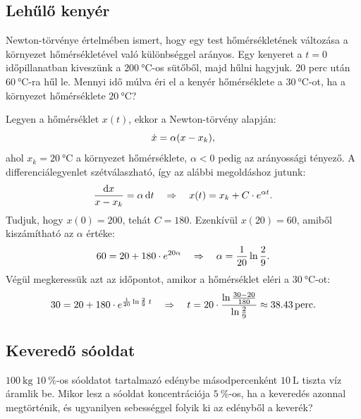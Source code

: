 \documentclass{szb-solution}
\begin{document}
\subsection{Lehűlő kenyér}

Newton-törvénye értelmében ismert, hogy egy test hőmérsékletének változása a
környezet hőmérsékletével való különbséggel arányos. Egy kenyeret a $t = 0$
időpillanatban kiveszünk a $\SI{200}{\degreeCelsius}$-os sütőből, majd hűlni
hagyjuk. 20 perc után $\SI{60}{\degreeCelsius}$-ra hűl le. Mennyi idő múlva éri
el a kenyér hőmérséklete a $\SI{30}{\degreeCelsius}$-ot, ha a környezet
hőmérséklete $\SI{20}{\degreeCelsius}$?

Legyen a hőmérséklet $x(t)$, ekkor a Newton-törvény alapján:
$$
  \dot x = \alpha (x - x_k)
  \text,
$$
ahol $x_k = \SI{20}{\degreeCelsius}$ a környezet hőmérséklete, $\alpha < 0$
pedig az arányossági tényező. A differenciálegyenlet szétválaszható, így az alábbi
megoldáshoz jutunk:
$$
  \frac{\mathop{}\!\mathrm{d} x}{x - x_k} = \alpha \mathop{}\!\mathrm{d} t
  \quad \Rightarrow \quad
  x(t) = x_k + C \cdot e^{\alpha t}
  \text.
$$
Tudjuk, hogy $x(0) = 200$, tehát $C = 180$. Ezenkívül $x(20) = 60$, amiből
kiszámítható az $\alpha$ értéke:
$$
  60 = 20 + 180 \cdot e^{20\alpha}
  \quad \Rightarrow \quad
  \alpha = \frac{1}{20} \ln \frac{2}{9}
  \text.
$$
Végül megkeressük azt az időpontot, amikor a hőmérséklet eléri a
$\SI{30}{\degreeCelsius}$-ot:
$$
  30 = 20 + 180 \cdot e^{\frac{1}{20} \ln \frac{2}{9} \; t}
  \quad \Rightarrow \quad
  t = 20 \cdot \frac{\ln \frac{30 - 20}{180}}{\ln \frac{2}{9}} \approx \SI{38.43}{perc}
  \text.
$$



\subsection{Keveredő sóoldat}

$\SI{100}{\kilogram}$ $\SI{10}{\percent}$-os sóoldatot tartalmazó edénybe
másodpercenként $\SI{10}{\liter}$ tiszta víz áramlik be. Mikor lesz a sóoldat
koncentrációja $\SI{5}{\percent}$-os, ha a keveredés azonnal megtörténik, és
ugyanilyen sebességgel folyik ki az edényből a keverék?
\end{document}
